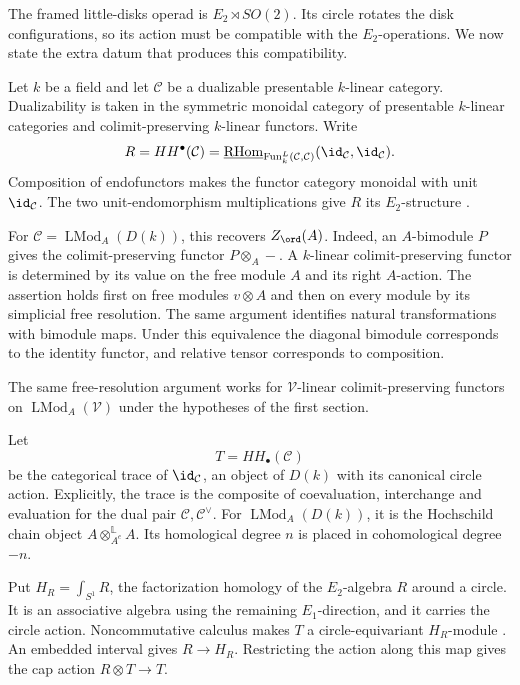 The framed little-disks operad is $E_2\rtimes SO(2)$.
Its circle rotates the disk configurations, so its action must be compatible with the $E_2$-operations.
We now state the extra datum that produces this compatibility.

Let $k$ be a field and let $\mathcal C$ be a dualizable presentable $k$-linear category.
Dualizability is taken in the symmetric monoidal category of presentable $k$-linear categories and colimit-preserving $k$-linear functors.
Write
\[
 R=HH^\bullet(\mathcal C)
   =\underline{\operatorname{RHom}}_{\operatorname{Fun}^L_k
       (\mathcal C,\mathcal C)}(\id_{\mathcal C},\id_{\mathcal C}).
\]
Composition of endofunctors makes the functor category monoidal with unit $\id_{\mathcal C}$.
The two unit-endomorphism multiplications give $R$ its $E_2$-structure
\cite[Proposition~2.1.5]{BravRozenblyum}.

For $\mathcal C=\operatorname{LMod}_A(D(k))$, this recovers $Z_{\ord}(A)$.
Indeed, an $A$-bimodule $P$ gives the colimit-preserving functor $P\otimes_A-$.
A $k$-linear colimit-preserving functor is determined by its value on the free module $A$ and its right $A$-action.
The assertion holds first on free modules $v\otimes A$ and then on every module by its simplicial free resolution.
The same argument identifies natural transformations with bimodule maps.
Under this equivalence the diagonal bimodule corresponds to the identity functor, and relative tensor corresponds to composition.

The same free-resolution argument works for $\mathcal V$-linear colimit-preserving functors on $\operatorname{LMod}_A(\mathcal V)$ under the hypotheses of the first section.

Let
\[
 T=HH_\bullet(\mathcal C)
\]
be the categorical trace of $\id_{\mathcal C}$, an object of $D(k)$ with its canonical circle action.
Explicitly, the trace is the composite of coevaluation, interchange and evaluation for the dual pair $\mathcal C,\mathcal C^\vee$.
For $\operatorname{LMod}_A(D(k))$, it is the Hochschild chain object $A\otimes_{A^e}^{\mathbb L}A$.
Its homological degree $n$ is placed in cohomological degree $-n$.

Put $H_R=\int_{S^1}R$, the factorization homology of the $E_2$-algebra $R$ around a circle.
It is an associative algebra using the remaining $E_1$-direction, and it carries the circle action.
Noncommutative calculus makes $T$ a circle-equivariant $H_R$-module
\cite[Theorem~2.3.7]{BravRozenblyum}.
An embedded interval gives $R\to H_R$.
Restricting the action along this map gives the cap action $R\otimes T\to T$.

